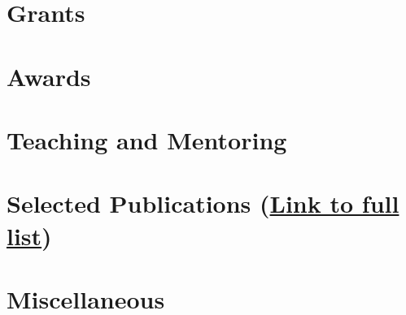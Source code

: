 \documentclass[a4paper,12pt]{article}
\begin{document}
\section{Grants}


\section{Awards}

\section{Teaching and Mentoring}


\section{Selected Publications (\href{https://gi.ece.ucsb.edu/Publications}{Link to full list})}


\section{Miscellaneous}


\vfill
{}
\end{document}
